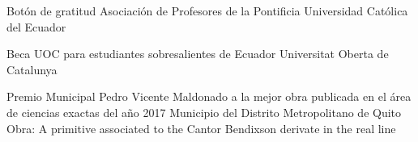 \documentclass[
    a4paper,
    maincolor=cvblue!70!blue,
    sidecolor=gray!30,
    sectioncolor=cvblue!70!blue,
    sidebarwidth=7.5cm,
    topbottommargin=20pt,
    leftrightmargin=20pt,
]{fortysecondscv}
\begin{document}
    {Botón de gratitud}
    {Asociación de Profesores de la Pontificia Universidad Católica del Ecuador}
    {}

    {Beca UOC para estudiantes sobresalientes de Ecuador}
    {Universitat Oberta de Catalunya}
    {}
    
    {Premio Municipal Pedro Vicente Maldonado a la mejor obra publicada en el área de ciencias exactas del año 2017}
    {Municipio del Distrito Metropolitano de Quito}
    {Obra: A primitive associated to the Cantor Bendixson derivate in the real line}
    

\end{document}
